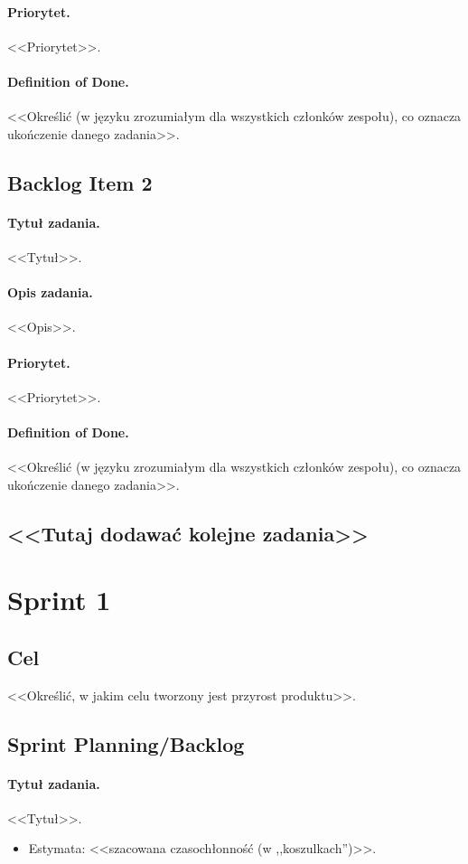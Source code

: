 \documentclass[a4paper]{article}
\begin{document}
\paragraph{Priorytet.} <<Priorytet>>.
\paragraph{Definition of Done.} <<Określić (w języku zrozumiałym dla wszystkich członków zespołu), co oznacza ukończenie danego zadania>>.

\subsection{Backlog Item 2}
\paragraph{Tytuł zadania.} <<Tytuł>>.
\paragraph{Opis zadania.} <<Opis>>.
\paragraph{Priorytet.} <<Priorytet>>.
\paragraph{Definition of Done.} <<Określić (w języku zrozumiałym dla wszystkich członków zespołu), co oznacza ukończenie danego zadania>>.

\subsection*{<<Tutaj dodawać kolejne zadania>>}

\section{Sprint 1}
\subsection{Cel} <<Określić, w jakim celu tworzony jest przyrost produktu>>.
\subsection{Sprint Planning/Backlog}

\paragraph{Tytuł zadania.} <<Tytuł>>.
\begin{itemize}
\item Estymata: <<szacowana czasochłonność (w ,,koszulkach'')>>.
\end{itemize}
\end{document}
